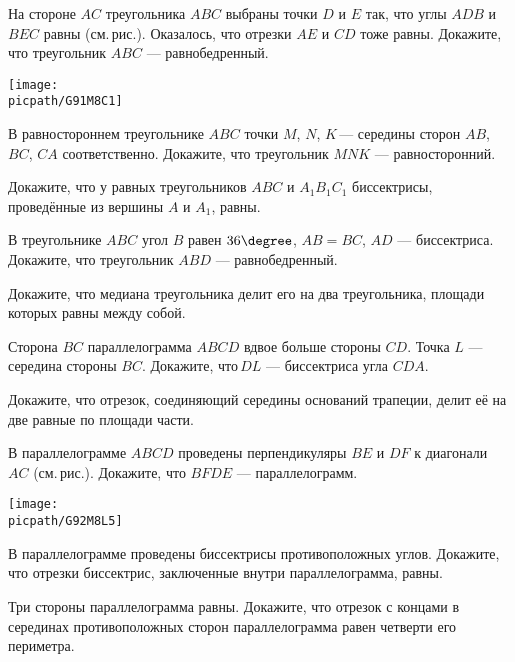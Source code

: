 \begin{class}[number=5]
	\begin{listofex}
		\item \begin{minipage}[t]{\bodywidth}
			На стороне \( AC \) треугольника \( ABC \) выбраны точки \( D \) и \( E \) так, что углы \( ADB \) и \( BEC \) равны (см. рис.). Оказалось, что отрезки \( AE \) и \( CD \) тоже равны. Докажите, что треугольник \( ABC \) --- равнобедренный.
		\end{minipage}
		\gapwidth
		\begin{minipage}[t]{\picwidth}
			\texttt{[image: \\picpath/G91M8C1]}
		\end{minipage}
		\item В равностороннем треугольнике \( ABC \) точки \( M \), \( N \), \( K \) --- середины сторон \( AB \), \( BC \), \( CA \) соответственно. Докажите, что треугольник \( MNK \) --- равносторонний.
		\item Докажите, что у равных треугольников \( ABC \) и \( A_1B_1C_1 \) биссектрисы, проведённые из вершины  \( A \) и \( A_1 \), равны.
		\item В треугольнике \( ABC \) угол \( B \) равен \( 36\degree \), \( AB=BC \), \( AD \) --- биссектриса. Докажите, что треугольник \( ABD \) --- равнобедренный.
		\item Докажите, что медиана треугольника делит его на два треугольника, площади которых равны между собой.
		\item Сторона \( BC \) параллелограмма \( ABCD \) вдвое больше стороны \( CD \). Точка \( L \) --- середина стороны \( BC \). Докажите, что \( DL \) --- биссектриса угла \( CDA \).
		\item Докажите, что отрезок, соединяющий середины оснований трапеции, делит её на две равные по площади части.
		\item \begin{minipage}[t]{\bodywidth}
			В параллелограмме \( ABCD \) проведены перпендикуляры \( BE \) и \( DF \) к диагонали \( AC \) (см. рис.). Докажите, что \( BFDE \) --- параллелограмм.
		\end{minipage}
		\gapwidth
		\begin{minipage}[t]{\picwidth}
			\texttt{[image: \\picpath/G92M8L5]}
		\end{minipage}
		\item В параллелограмме проведены биссектрисы противоположных углов. Докажите, что отрезки биссектрис, заключенные внутри параллелограмма, равны.
		\item Три стороны параллелограмма равны. Докажите, что отрезок с концами в серединах противоположных сторон параллелограмма равен четверти его периметра.
	\end{listofex}
\end{class}

